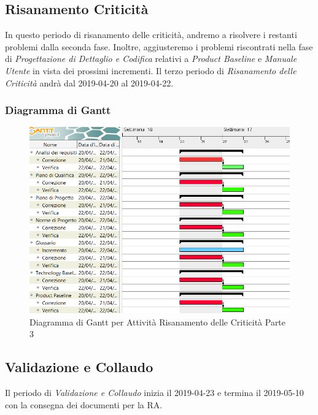 \subsection{Risanamento Criticità}
In questo periodo di risanamento delle criticità, andremo a risolvere i restanti problemi dalla seconda fase. Inoltre, aggiusteremo i problemi riscontrati nella fase di \textit{Progettazione di Dettaglio e Codifica} relativi a \textit{Product Baseline} e \textit{Manuale Utente} in vista dei prossimi incrementi.
Il terzo periodo di \textit{Risanamento delle Criticità} andrà dal 2019-04-20 al 2019-04-22.

\subsubsection{Diagramma di Gantt}
\begin{figure}[h]
	\centering
  		\includegraphics[width=1.0\linewidth]{./images/RisanamentoCriticita3.png}
  		\caption{Diagramma di Gantt per Attività Risanamento delle Criticità Parte 3}
  		\label{fig:Gantt Risananmento Criticità 3}
\end{figure}

\newpage
\subsection{Validazione e Collaudo}
Il periodo di \textit{Validazione e Collaudo} inizia il 2019-04-23 e termina il 2019-05-10 con la consegna dei documenti per la RA. 

